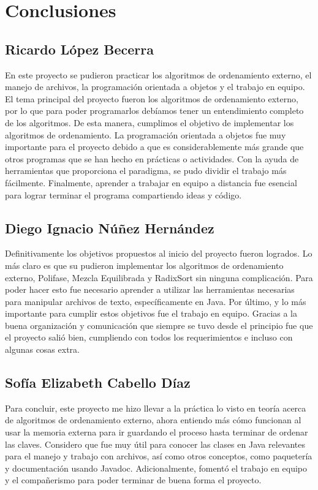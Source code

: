 \documentclass[11pt]{article}
\begin{document}
\section{Conclusiones}

\subsection{Ricardo López Becerra}
En este proyecto se pudieron practicar los algoritmos de ordenamiento externo, el manejo de archivos, la programación orientada a objetos y el trabajo en equipo.
El tema principal del proyecto fueron los algoritmos de ordenamiento externo, por lo que para poder programarlos debíamos tener un entendimiento completo de los algoritmos. De esta manera, cumplimos el objetivo de implementar los algoritmos de ordenamiento.
La programación orientada a objetos fue muy importante para el proyecto debido a que es considerablemente más grande que otros programas que se han hecho en prácticas o actividades. Con la ayuda de herramientas que proporciona el paradigma, se pudo dividir el trabajo más fácilmente.
Finalmente, aprender a trabajar en equipo a distancia fue esencial para lograr terminar el programa compartiendo ideas y código.

\subsection{Diego Ignacio Núñez Hernández}
Definitivamente los objetivos propuestos al inicio del proyecto fueron logrados. 
Lo más claro es que su pudieron implementar los algoritmos de ordenamiento externo, Polifase, Mezcla Equilibrada y RadixSort sin ninguna complicación. Para poder hacer esto fue necesario aprender a utilizar las herramientas necesarias para manipular archivos de texto, específicamente en Java. Por último, y lo más importante para cumplir estos objetivos fue el trabajo en equipo. Gracias a la buena organización y comunicación que siempre se tuvo desde el principio fue que el proyecto salió bien, cumpliendo con todos los requerimientos e incluso con algunas cosas extra.

\subsection{Sofía Elizabeth Cabello Díaz}
Para concluir, este proyecto me hizo llevar a la práctica lo visto en teoría acerca de algoritmos de ordenamiento externo, ahora entiendo más cómo funcionan al usar la memoria externa para ir guardando el proceso hasta terminar de ordenar las claves. Considero que fue muy útil para conocer las clases en Java relevantes para el manejo y trabajo con archivos, así como otros conceptos, como paquetería y documentación usando Javadoc. Adicionalmente, fomentó el trabajo en equipo y el compañerismo para poder terminar de buena forma el proyecto.
\end{document}
